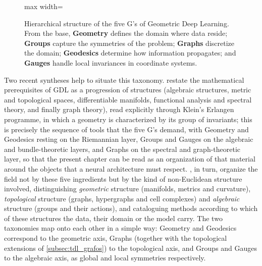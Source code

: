 \begin{figure}[htbp]
\begin{adjustbox}{max width=\textwidth}
\end{adjustbox}
\caption[Hierarchy of the five G's of GDL]{Hierarchical structure of the five G's of Geometric Deep Learning. From the base, \textbf{Geometry} defines the domain where data reside; \textbf{Groups} capture the symmetries of the problem; \textbf{Graphs} discretize the domain; \textbf{Geodesics} determine how information propagates; and \textbf{Gauges} handle local invariances in coordinate systems.}
\label{fig:jerarquia_5gs}
\end{figure}

Two recent syntheses help to situate this taxonomy. \citet{saezdeocarizborde2025mathfoundations} restate the mathematical prerequisites of \gls{GDL} as a progression of structures (algebraic structures, metric and topological spaces, differentiable manifolds, functional analysis and spectral theory, and finally graph theory), read explicitly through Klein's Erlangen programme, in which a geometry is characterized by its group of invariants; this is precisely the sequence of tools that the five G's demand, with Geometry and Geodesics resting on the Riemannian layer, Groups and Gauges on the algebraic and bundle-theoretic layers, and Graphs on the spectral and graph-theoretic layer, so that the present chapter can be read as an organization of that material around the objects that a neural architecture must respect. \citet{papillon2024beyondeuclid}, in turn, organize the field not by these five ingredients but by the kind of non-Euclidean structure involved, distinguishing \textit{geometric} structure (manifolds, metrics and curvature), \textit{topological} structure (graphs, hypergraphs and cell complexes) and \textit{algebraic} structure (groups and their actions), and cataloguing methods according to which of these structures the data, their domain or the model carry. The two taxonomies map onto each other in a simple way: Geometry and Geodesics correspond to the geometric axis, Graphs (together with the topological extensions of \autoref{subsec:tdl_grafos}) to the topological axis, and Groups and Gauges to the algebraic axis, as global and local symmetries respectively.

